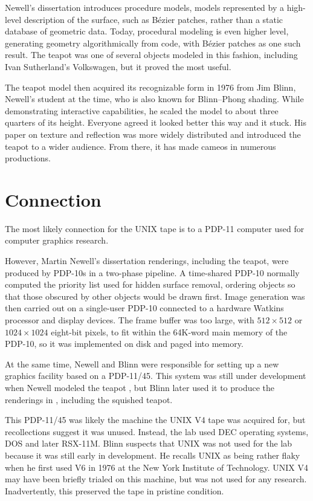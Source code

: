 Newell's dissertation \cite{newell75proceduremodels} introduces procedure models, models represented by a high-level description of the surface, such as Bézier patches, rather than a static database of geometric data.
Today, procedural modeling is even higher level, generating geometry algorithmically from code, with Bézier patches as one such result.
The teapot was one of several objects modeled in this fashion, including Ivan Sutherland's Volkswagen, but it proved the most useful.

The teapot model then acquired its recognizable form in 1976 from Jim Blinn, Newell's student at the time, who is also known for Blinn--Phong shading.
While demonstrating interactive capabilities, he scaled the model to about three quarters of its height.
Everyone agreed it looked better this way and it stuck.
His paper on texture and reflection \cite{blinn76texture} was more widely distributed and introduced the teapot to a wider audience.
From there, it has made cameos in numerous productions.

\section{Connection}

The most likely connection for the UNIX tape is to a PDP-11 computer used for computer graphics research.

However, Martin Newell's dissertation renderings, including the teapot, were produced by PDP-10s in a two-phase pipeline.
A time-shared PDP-10 normally computed the priority list used for hidden surface removal, ordering objects so that those obscured by other objects would be drawn first.
Image generation was then carried out on a single-user PDP-10 connected to a hardware Watkins processor and display devices.
The frame buffer was too large, with \(512 \times 512\) or \(1024 \times 1024\) eight-bit pixels, to fit within the 64K-word main memory of the PDP-10, so it was implemented on disk and paged into memory.

At the same time, Newell and Blinn were responsible for setting up a new graphics facility based on a PDP-11/45.
This system was still under development when Newell modeled the teapot \cite{newell74manmachine}, but Blinn later used it to produce the renderings in \cite{blinn76texture}, including the squished teapot.

This PDP-11/45 was likely the machine the UNIX V4 tape was acquired for, but recollections suggest it was unused.
Instead, the lab used DEC operating systems, DOS and later RSX-11M.
Blinn suspects that UNIX was not used for the lab because it was still early in development.
He recalls UNIX as being rather flaky when he first used V6 in 1976 at the New York Institute of Technology.
UNIX V4 may have been briefly trialed on this machine, but was not used for any research.
Inadvertently, this preserved the tape in pristine condition.


